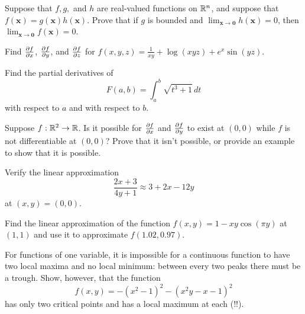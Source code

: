 \documentclass{watsonbook}
\begin{document}
\begin{aexercise}
  Suppose that $f,g,$ and $h$ are real-valued functions on $\mathbb{R}^n$, and
  suppose that $f(\mathbf{x}) = g(\mathbf{x})h(\mathbf{x})$. Prove that if $g$
  is bounded and $\lim_{\mathbf{x}\to \mathbf{0}}h(\mathbf{x}) = 0$, then
  $\lim_{\mathbf{x}\to \mathbf{0}}f(\mathbf{x}) = 0$.
\end{aexercise}


\begin{aexercise}
  Find $\frac{\partial f}{\partial x}$, $\frac{\partial f}{\partial y}$, and $\frac{\partial f}{\partial z}$ for
  $f(x,y,z) = \frac{1}{xy} + \log(xyz) + e^x\sin(y z) $.
\end{aexercise}

\begin{aexercise}
  Find the partial derivatives of
  \[
    F(a,b) = \int_a^b \sqrt{t^3+1}\,dt
  \]
  with respect to $a$ and with respect to $b$.
\end{aexercise}


\begin{aexercise}
  Suppose $f:\mathbb{R}^2 \to \mathbb{R}$. Is it possible for $\frac{\partial f}{\partial x}$ and
  $\frac{\partial f}{\partial y}$ to exist at $(0,0)$ while $f$ is not differentiable at
  $(0,0)$?  Prove that it isn't possible, or provide an example to
  show that it is possible.
\end{aexercise}


\begin{aexercise}
  Verify the linear approximation
  \[
    \frac{2x+3}{4y+1} \approx 3 + 2x - 12y
  \]
  at $(x,y) = (0,0)$.
\end{aexercise}

\begin{aexercise}
  Find the linear approximation of the function
  $f(x,y) = 1-xy\cos(\pi y)$ at $(1,1)$ and use it to approximate
  $f(1.02,0.97)$.
\end{aexercise}




\begin{aexercise}
  For functions of one variable, it is impossible for a continuous
  function to have two local maxima and no local minimum: between
  every two peaks there must be a trough. Show, however, that the
  function
  \[
    f(x,y) = -(x^2-1)^2-(x^2y-x-1)^2
  \]
  has only two critical points and has a local maximum at each (!!). 
\end{aexercise}
\end{document}
